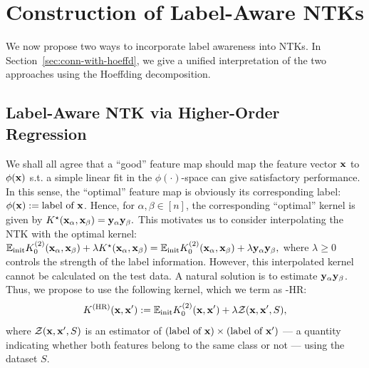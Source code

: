 

\section{Construction of Label-Aware NTKs}\label{sec:label_aware_kernels}



We now propose two ways to incorporate label awareness into NTKs. In Section~\ref{sec:conn-with-hoeffd}, we give a unified interpretation of the two approaches using the Hoeffding decomposition.


\subsection{Label-Aware NTK via Higher-Order Regression}\label{subsec:higher-order-regression}
We shall all agree that a ``good'' feature map should map the feature vector ${\mathbf{x}}$ to $\phi({\mathbf{x}} )$ s.t. a simple linear fit in the $\phi(\cdot)$-space can give satisfactory performance. 
In this sense, the ``optimal'' feature map is obviously its corresponding label: $\phi({\mathbf{x}} ) := \textnormal{label of } {\mathbf{x}}$. Hence, for $\alpha, \beta\in[n]$, the corresponding ``optimal'' kernel is given by $K^{\star}({\mathbf{x}}_\alpha, {\mathbf{x}}_\beta) = {\mathbf{y}}_\alpha {\mathbf{y}}_\beta.$
This motivates us to consider interpolating the NTK with the optimal kernel:
$
{\mathbb{E}}_{\textnormal{init}} K^{(2)}_0({\mathbf{x}}_\alpha, {\mathbf{x}}_\beta) + \lambda K^{\star}({\mathbf{x}}_\alpha, {\mathbf{x}}_\beta) = {\mathbb{E}}_{\textnormal{init}} K^{(2)}_0({\mathbf{x}}_\alpha, {\mathbf{x}}_\beta)+ \lambda {\mathbf{y}}_\alpha {\mathbf{y}}_\beta, 
$
where $\lambda \geq 0$ controls the strength of the label information. 
However, this interpolated kernel cannot be calculated on the test data. A natural solution is to estimate ${\mathbf{y}}_\alpha {\mathbf{y}}_\beta$. Thus, we propose to use the following kernel, which we term as \lantk-HR:
\begin{equation}
	\label{eq: 2nd_order_reg_kernel}
	K^{(\textnormal{HR})}({\mathbf{x}}, {\mathbf{x}}') :  = {\mathbb{E}}_{\textnormal{init}} K^{(2)}_0({\mathbf{x}}, {\mathbf{x}}') + \lambda {\mathcal{Z}}({\mathbf{x}}, {\mathbf{x}}', S), 
\end{equation}
where ${\mathcal{Z}}({\mathbf{x}}, {\mathbf{x}}', S)$ is an estimator of $(\textnormal{label of }{\mathbf{x}}) \times (\textnormal{label of }{\mathbf{x}}')$ --- a quantity indicating whether both features belong to the same class or not --- using the dataset $S$.


